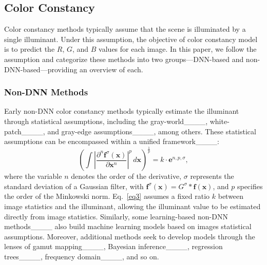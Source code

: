 \subsection{Color Constancy} \label{sec2.2}
Color constancy methods typically assume that the scene is illuminated by a single illuminant. Under this assumption, the objective of color constancy model is to predict the $R$, $G$, and $B$ values for each image. In this paper, we follow the assumption and categorize these methods into two groups—DNN-based and non-DNN-based—providing an overview of each.

\subsubsection{Non-DNN Methods} \label{sec2.2.1}
Early non-DNN color constancy methods typically estimate the illuminant through statistical assumptions, including the gray-world____, white-patch____, and gray-edge assumptions____, among others. These statistical assumptions can be encompassed within a unified framework____:
\begin{equation} \label{eq3}
\left( \int \left| \frac{\partial^n \boldsymbol{f}^{\sigma}(\boldsymbol{x})}{\partial \boldsymbol{x}^n} \right|^p \, d\boldsymbol{x} \right)^{\frac{1}{p}} = k \cdot \boldsymbol{e}^{n,p,\sigma},
\end{equation}
where the variable \( n \) denotes the order of the derivative, \( \sigma \) represents the standard deviation of a Gaussian filter, with \( \boldsymbol{f}^{\sigma}(\boldsymbol{x}) = G^{\sigma} * \boldsymbol{f}(\boldsymbol{x}) \), and \( p \) specifies the order of the Minkowski norm. 
Eq.~\ref{eq3} assumes a fixed ratio \( k \) between image statistics and the illuminant, allowing the illuminant value to be estimated directly from image statistics.
Similarly, some learning-based non-DNN methods____ also build machine learning models based on images statistical assumptions. Moreover, additional methods seek to develop models through the lenses of gamut mapping____, Bayesian inference____, regression trees____, frequency domain____, and so on.

